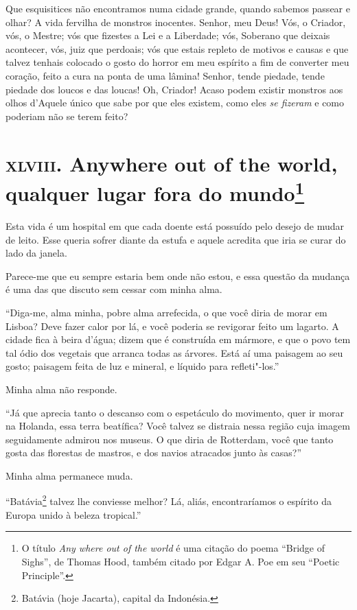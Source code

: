 Que esquisitices não encontramos numa cidade grande, quando sabemos
passear e olhar? A vida fervilha de monstros inocentes. Senhor, meu
Deus! Vós, o Criador, vós, o Mestre; vós que fizestes a Lei e a
Liberdade; vós, Soberano que deixais acontecer, vós, juiz que perdoais;
vós que estais repleto de motivos e causas e que talvez tenhais
colocado o gosto do horror em meu espírito a fim de converter meu
coração, feito a cura na ponta de uma lâmina! Senhor, tende piedade,
tende piedade dos loucos e das loucas! Oh, Criador! Acaso podem existir
monstros aos olhos d’Aquele único que sabe por
que eles existem, como eles \textit{se fizeram} e como poderiam não se
terem feito?

\chapter{\textsc{xlviii.} Anywhere out of the world, qualquer lugar fora do mundo\footnote[*]{O título \textit{Any where 
out of the world} é uma citação do poema
``Bridge of Sighs'', de Thomas Hood, também citado por Edgar A. Poe em seu ``Poetic Principle''.}}

Esta vida é um hospital em que cada doente está possuído pelo desejo de
mudar de leito. Esse queria sofrer diante da estufa e aquele
acredita que iria se curar do lado da janela.

Parece-me que eu sempre estaria bem onde não estou, e essa questão
da mudança é uma das que discuto sem cessar com minha alma.

“Diga-me, alma minha, pobre alma arrefecida, o que você
diria de morar em Lisboa? Deve fazer calor por lá, e você poderia se revigorar
feito um lagarto. A cidade fica à beira d’água; dizem que é
construída em mármore, e que o povo tem tal ódio dos vegetais que
arranca todas as árvores. Está aí uma paisagem ao seu gosto;
paisagem feita de luz e mineral, e líquido para refleti"-los.''

Minha alma não responde.

“Já que aprecia tanto o descanso com o espetáculo do
movimento, quer ir morar na Holanda, essa terra beatífica? Você
talvez se distraia nessa região cuja imagem seguidamente admirou nos
museus. O que diria de Rotterdam, você que tanto gosta das florestas de
mastros, e dos navios atracados junto às casas?''

Minha alma permanece muda.

“Batávia\footnote{ Batávia (hoje Jacarta), capital da Indonésia.}
 talvez lhe conviesse melhor?
Lá, aliás, encontraríamos o espírito da Europa unido à beleza
tropical.''

